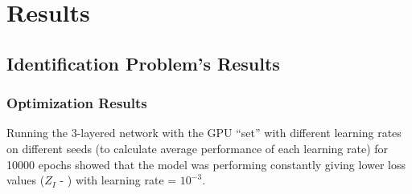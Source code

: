\section{Results} \label{sec:Results}
\subsection{Identification Problem's Results} \label{sec:Identification Problem's Results}
\subsubsection{Optimization Results} \label{sec:IdProbRes - Optimization}
Running the 3-layered network with the GPU ``set'' with different learning rates on different seeds (to calculate average performance of each learning rate) for 10000 epochs showed that the model was performing constantly giving lower loss values ($Z_I$ - ) with learning rate = $10^{-3}$. 

